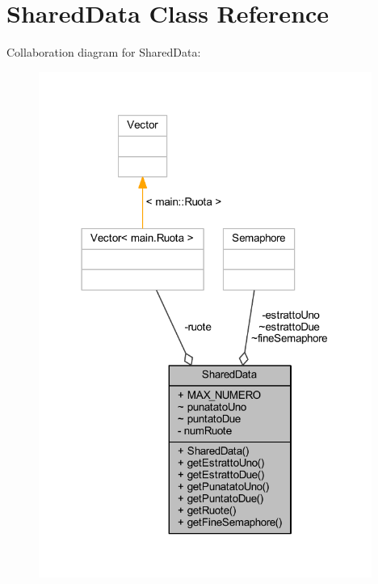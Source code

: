 \hypertarget{classmain_1_1_shared_data}{}\section{Shared\+Data Class Reference}
\label{classmain_1_1_shared_data}


Collaboration diagram for Shared\+Data\+:
\nopagebreak
\begin{figure}[H]
\begin{center}
\leavevmode
\includegraphics[width=309pt]{classmain_1_1_shared_data__coll__graph}
\end{center}
\end{figure}
